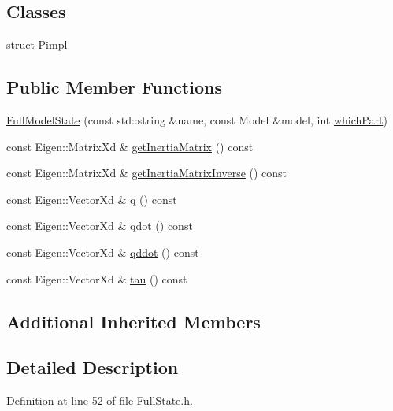 \subsection*{Classes}
\begin{DoxyCompactItemize}
\item 
struct \hyperlink{structocra_1_1FullModelState_1_1Pimpl}{Pimpl}
\end{DoxyCompactItemize}
\subsection*{Public Member Functions}
\begin{DoxyCompactItemize}
\item 
\hyperlink{classocra_1_1FullModelState_a2fc326508bd940f338c614c18549a7ba}{Full\+Model\+State} (const std\+::string \&name, const Model \&model, int \hyperlink{classocra_1_1FullState_a75ec7c039df8cb8608ebf34f7b779be5}{which\+Part})
\item 
const Eigen\+::\+Matrix\+Xd \& \hyperlink{classocra_1_1FullModelState_a988dec9567fd2b083ecfb6f3348d9a09}{get\+Inertia\+Matrix} () const
\item 
const Eigen\+::\+Matrix\+Xd \& \hyperlink{classocra_1_1FullModelState_adf7ce7128a112c3f2b6367b6c0f6b9a2}{get\+Inertia\+Matrix\+Inverse} () const
\item 
const Eigen\+::\+Vector\+Xd \& \hyperlink{classocra_1_1FullModelState_a3a560064b1be8bd1579382aa08686904}{q} () const
\item 
const Eigen\+::\+Vector\+Xd \& \hyperlink{classocra_1_1FullModelState_a034c567bae39a29f391f6462f52b0834}{qdot} () const
\item 
const Eigen\+::\+Vector\+Xd \& \hyperlink{classocra_1_1FullModelState_a2578e15742268c14fb4ce5f26033256e}{qddot} () const
\item 
const Eigen\+::\+Vector\+Xd \& \hyperlink{classocra_1_1FullModelState_aa774cf6a9a50ed4b50c037ae981d2c7b}{tau} () const
\end{DoxyCompactItemize}
\subsection*{Additional Inherited Members}


\subsection{Detailed Description}


Definition at line 52 of file Full\+State.\+h.



